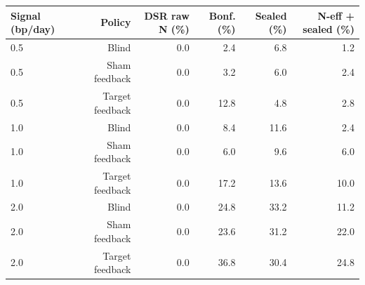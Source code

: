 \begin{tabular}{lrrrrr}
\toprule
Signal (bp/day) & Policy & DSR raw N (\%) & Bonf. (\%) & Sealed (\%) & N-eff + sealed (\%) \\
\midrule
0.5 & Blind & 0.0 & 2.4 & 6.8 & 1.2 \\
0.5 & Sham feedback & 0.0 & 3.2 & 6.0 & 2.4 \\
0.5 & Target feedback & 0.0 & 12.8 & 4.8 & 2.8 \\
1.0 & Blind & 0.0 & 8.4 & 11.6 & 2.4 \\
1.0 & Sham feedback & 0.0 & 6.0 & 9.6 & 6.0 \\
1.0 & Target feedback & 0.0 & 17.2 & 13.6 & 10.0 \\
2.0 & Blind & 0.0 & 24.8 & 33.2 & 11.2 \\
2.0 & Sham feedback & 0.0 & 23.6 & 31.2 & 22.0 \\
2.0 & Target feedback & 0.0 & 36.8 & 30.4 & 24.8 \\
\bottomrule
\end{tabular}
